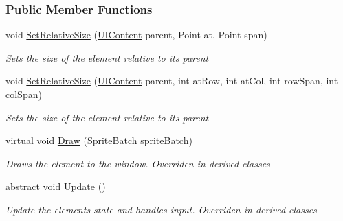 \subsubsection*{Public Member Functions}
\begin{DoxyCompactItemize}
\item 
void \hyperlink{class_m_b2_d_1_1_u_i_1_1_u_i_element_a4c3d52b5993c5f1d6615d0535fdd9e19}{Set\+Relative\+Size} (\hyperlink{class_m_b2_d_1_1_u_i_1_1_u_i_content}{U\+I\+Content} parent, Point at, Point span)
\begin{DoxyCompactList}\small\item\em Sets the size of the element relative to its parent \end{DoxyCompactList}\item 
void \hyperlink{class_m_b2_d_1_1_u_i_1_1_u_i_element_ada6dd87befb618ea03e8a3d30ae3fea9}{Set\+Relative\+Size} (\hyperlink{class_m_b2_d_1_1_u_i_1_1_u_i_content}{U\+I\+Content} parent, int at\+Row, int at\+Col, int row\+Span, int col\+Span)
\begin{DoxyCompactList}\small\item\em Sets the size of the element relative to its parent \end{DoxyCompactList}\item 
virtual void \hyperlink{class_m_b2_d_1_1_u_i_1_1_u_i_element_afec98e6e38cb0dbc17a5db6d6a3d5ba5}{Draw} (Sprite\+Batch sprite\+Batch)
\begin{DoxyCompactList}\small\item\em Draws the element to the window. Overriden in derived classes \end{DoxyCompactList}\item 
abstract void \hyperlink{class_m_b2_d_1_1_u_i_1_1_u_i_element_aa97bcbe44f3fac8a13e2febca23b2d4d}{Update} ()
\begin{DoxyCompactList}\small\item\em Update the elements state and handles input. Overriden in derived classes \end{DoxyCompactList}\end{DoxyCompactItemize}
